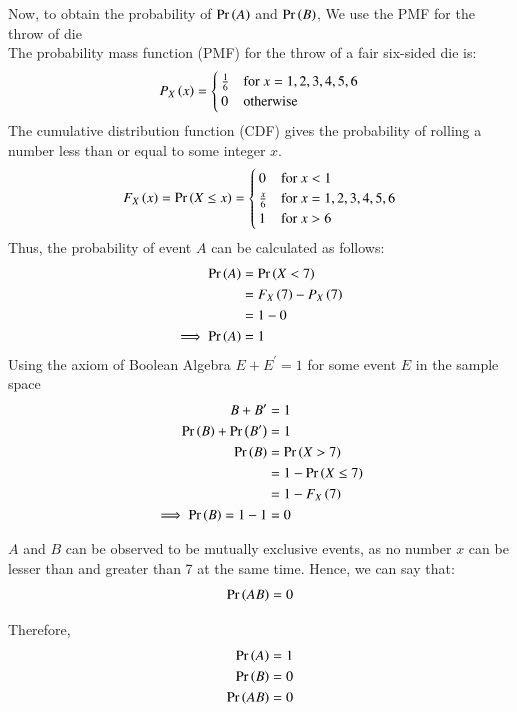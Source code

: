 \documentclass[journal]{IEEEtran}
\begin{document}
\newpage
Now, to obtain the probability of $\Pr\left(A\right)$ and $\Pr\left(B\right)$, We use the PMF for the throw of die \\

The probability mass function (PMF) for the throw of a fair six-sided die is:
\begin{align}
    P_X\left(x\right) = \begin{cases}
        \frac{1}{6} & \text{for } x = 1, 2, 3, 4, 5, 6 \\
        0 & \text{otherwise}
    \end{cases}
\end{align}
The cumulative distribution function (CDF) gives the probability of rolling a number less than or equal to some integer $x$.
\begin{align}
    F_X\left(x\right) = \Pr\left(X \leq x\right) = \begin{cases}
        0 & \text{for } x < 1 \\
        \frac{x}{6} & \text{for } x = 1, 2, 3, 4, 5, 6 \\
        1 & \text{for } x > 6
    \end{cases}
\end{align}
Thus, the probability of event $A$ can be calculated as follows:
\begin{align}
    \Pr\left(A\right) &= \Pr\left(X < 7\right)\\
    &=F_X\left(7\right) - P_X\left(7\right)\\
    &=1 - 0 \\
    \implies \Pr \left(A\right)&= 1
\end{align}
Using the axiom of Boolean Algebra $E+E^{\prime}=1$ for some event $E$ in the sample space
\begin{align}
    B+B^{\prime}&=1\\
    \Pr\left(B\right)+ \Pr\left(B^{\prime}\right)&=1\\
    \Pr\left(B\right) &= \Pr\left(X > 7\right)\\
     &=1 - \Pr\left(X \leq 7\right) \\
     &= 1 - F_X\left(7\right)\\
     \implies \Pr\left(B\right) = 1 - 1 &= 0
\end{align}

$A$ and $B$ can be observed to be mutually exclusive events, as no number $x$ can be lesser than and greater than 7 at the same time.
Hence, we can say that:
\begin{align}
    \Pr\left(AB\right) = 0
\end{align}

Therefore,
\begin{align}
    \Pr\left(A\right)=1\\
    \Pr\left(B\right)=0\\
    \Pr\left(AB\right)=0
\end{align}
\end{document}
